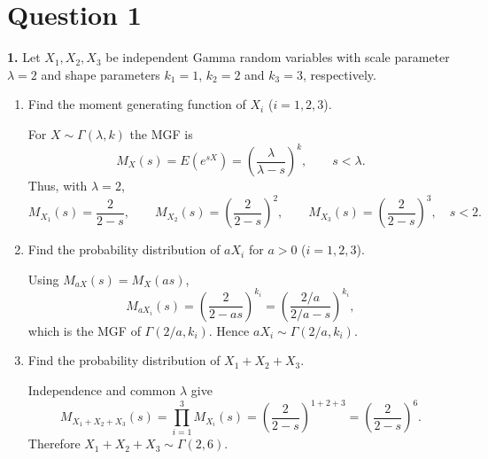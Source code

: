 \documentclass[dvipsnames,11pt]{article}
\begin{document}
\section*{Question 1}

\textbf{1.} Let $X_1, X_2 , X_3$ be independent Gamma random variables with scale parameter $\lambda=2$ and shape parameters $k_1=1$, $k_2=2$ and $k_3=3$, respectively.

    \begin{enumerate}[label=\alph*.]
        \item Find the moment generating function of $X_i$ ($i=1,2,3$).
    
            \begin{solution}
    
                For $X\sim\Gamma(\lambda,k)$ the MGF is
                \[
                M_X(s)=E(e^{sX})=\left(\frac{\lambda}{\lambda-s}\right)^k,\qquad s<\lambda.
                \]
                Thus, with $\lambda=2$,
                \[
                M_{X_1}(s)=\frac{2}{2-s},\qquad
                M_{X_2}(s)=\left(\frac{2}{2-s}\right)^2,\qquad
                M_{X_3}(s)=\left(\frac{2}{2-s}\right)^3,\quad s<2.
                \]
                
            \end{solution}
            
        \item Find the probability distribution of $aX_i$ for $a>0$ ($i=1,2,3$).
    
            \begin{solution}
    
                Using $M_{aX}(s)=M_X(as)$,
                \[
                M_{aX_i}(s)=\left(\frac{2}{2-as}\right)^{k_i}
                =\left(\frac{2/a}{2/a-s}\right)^{k_i},
                \]
                which is the MGF of $\Gamma(2/a,k_i)$. Hence $aX_i\sim\Gamma(2/a,k_i)$.
                
            \end{solution}
            
        \item Find the probability distribution of $X_1+X_2+X_3$.
    
            \begin{solution}
    
                Independence and common $\lambda$ give
                \[
                M_{X_1+X_2+X_3}(s)=\prod_{i=1}^3 M_{X_i}(s)
                =\left(\frac{2}{2-s}\right)^{1+2+3}
                =\left(\frac{2}{2-s}\right)^{6}.
                \]
                Therefore $X_1+X_2+X_3\sim \Gamma(2,6)$.
                

\end{solution}
\end{enumerate}
\end{document}
